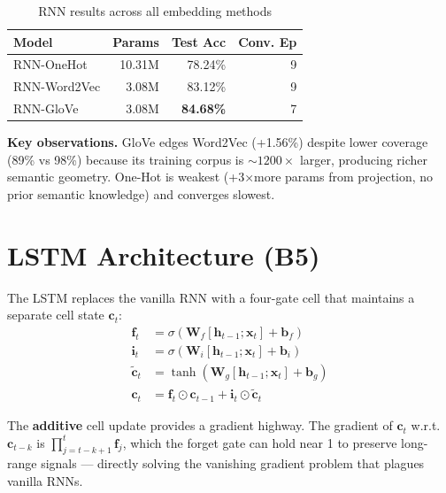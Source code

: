 \documentclass[10pt,a4paper,twocolumn]{article}
\begin{document}
\begin{table}[H]
\centering\small
\caption{RNN results across all embedding methods}
\begin{tabular}{lrrr}
\toprule
Model & Params & Test Acc & Conv. Ep\\
\midrule
RNN-OneHot   & 10.31M & 78.24\% & 9\\
RNN-Word2Vec &  3.08M & 83.12\% & 9\\
RNN-GloVe    &  3.08M & \textbf{84.68\%} & 7\\
\bottomrule
\end{tabular}
\label{tab:b4}
\end{table}

\textbf{Key observations.}
GloVe edges Word2Vec (+1.56\%) despite lower coverage (89\% vs 98\%) because
its training corpus is ${\sim}1200\times$ larger, producing richer semantic
geometry. One-Hot is weakest (+3×more params from projection, no prior
semantic knowledge) and converges slowest.

\section{LSTM Architecture (B5)}

The LSTM replaces the vanilla RNN with a four-gate cell that maintains
a separate cell state $\mathbf{c}_t$:
\begin{align}
  \mathbf{f}_t &= \sigma(\mathbf{W}_f[\mathbf{h}_{t-1};\mathbf{x}_t]+\mathbf{b}_f)\\
  \mathbf{i}_t &= \sigma(\mathbf{W}_i[\mathbf{h}_{t-1};\mathbf{x}_t]+\mathbf{b}_i)\\
  \tilde{\mathbf{c}}_t &= \tanh(\mathbf{W}_g[\mathbf{h}_{t-1};\mathbf{x}_t]+\mathbf{b}_g)\\
  \mathbf{c}_t &= \mathbf{f}_t\!\odot\!\mathbf{c}_{t-1}+\mathbf{i}_t\!\odot\!\tilde{\mathbf{c}}_t
\end{align}

The \textbf{additive} cell update provides a gradient highway. The gradient
of $\mathbf{c}_t$ w.r.t.\ $\mathbf{c}_{t-k}$ is $\prod_{j=t-k+1}^{t}\mathbf{f}_j$,
which the forget gate can hold near 1 to preserve long-range signals —
directly solving the vanishing gradient problem that plagues vanilla RNNs.
\end{document}
